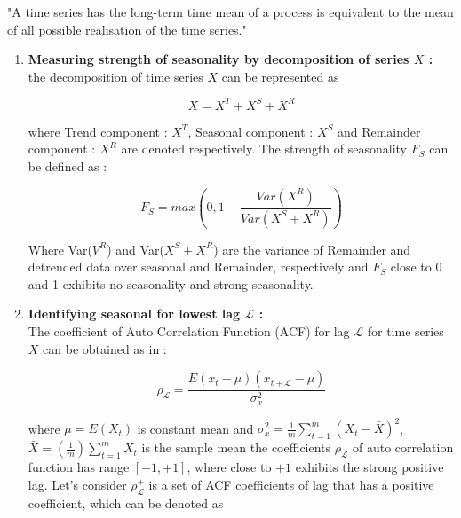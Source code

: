   \begin{definition}\label{ep uv}
    "A time series has the long-term time mean of a process is equivalent to the mean of all possible realisation of the time series."    
  \end{definition}

\begin{enumerate}[label=(\alph*)]

\item \textbf{Measuring strength of seasonality by decomposition of series $X$ :}\\
the decomposition of time series $X$ can be represented  as 

\begin{equation}
  \label{x}
  X = X^T + X^S +X^R
\end{equation}

where Trend component : $X^T$,  Seasonal component :  $X^S$ and Remainder component :  $X^R$ are denoted respectively. 
The strength of seasonality $F_S$ can be defined as : 

\begin{equation}\label{fs}
  F_S=max \left(0, 1- \frac{Var (X^R)}{Var(X^S + X^R)} \right)
\end{equation}

Where Var($V^R$) and Var($X^S + X^R$) are the variance of Remainder and detrended data over seasonal and Remainder, respectively and $F_S$ close to 0 and 1 exhibits no seasonality and strong seasonality.

\item \textbf{Identifying seasonal for lowest lag $\mathscr{L}$ :} \\
The coefficient of Auto Correlation Function (ACF) for lag $\mathscr{L}$ for time series $X$ can be obtained as in : 

\begin{equation}
  \label{rovh}
  \rho_{\mathscr{L}}=\frac{E(x_t - \mu)(x_{t+ \mathscr{L}}-\mu)}{\sigma_x^2}
\end{equation}

where $\mu=E(X_t)$ is constant mean and $\sigma_x^2 = \frac{1}{m} \sum_{t=1}^{m} (X_t - \bar{X} )^2$,  $\bar{X}= \left(\frac{1}{m} \right) \sum_{t=1}^{m} X_t$ is the sample mean the coefficients $\rho_\mathscr{L}$ of auto correlation function has range $[-1,  +1]$,  where close to $+1$ exhibits the strong positive lag. Let's consider $\rho_\mathscr{L}^+$ is a set of ACF coefficients of lag that has a positive coefficient,  which can be denoted as


\end{enumerate}
